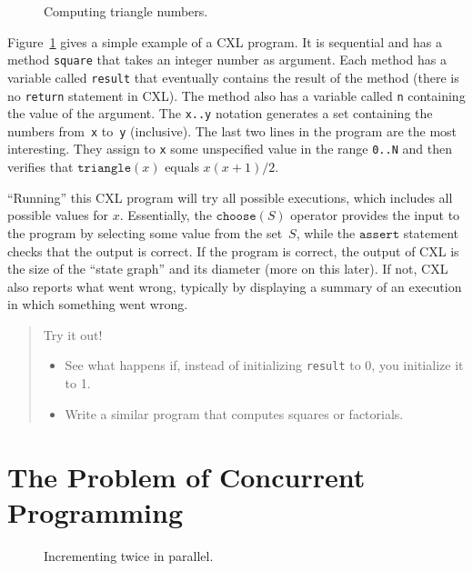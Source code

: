 \documentclass{report}
\newenvironment{code}{
\tcolorbox
}{
\endtcolorbox
}
\begin{document}
\begin{figure}
\begin{code}

\end{code}
\caption{Computing triangle numbers.}
\label{fig:triangle}
\end{figure}

Figure~\ref{fig:triangle} gives a simple example of a CXL program.
It is sequential and has a method \texttt{square} that takes
an integer number as argument.  Each method has a variable called
\texttt{result} that eventually contains the result of the
method (there is no \texttt{return} statement in CXL).  The method
also has a variable called \texttt{n} containing the value of the
argument.  The \texttt{x..y} notation generates a set containing the numbers
from~\texttt{x} to~\texttt{y} (inclusive).  The last two lines in the program are
the most interesting.
They assign to \texttt{x} some unspecified value in the range \texttt{0..N}
and then verifies that $\mathtt{triangle}(x)$ equals $x(x+1)/2$.

``Running'' this CXL program will try all possible executions, which
includes all possible values for $x$.  Essentially, the $\texttt{choose}(S)$
operator provides the input to the program by selecting some value from the
set~$S$, while the $\texttt{assert}$ statement checks that the output is
correct.  If the program is correct, the output of CXL is the size of the
``state graph'' and its diameter (more on this later).  If not, CXL also
reports what went wrong, typically by displaying a summary of an execution in
which something went wrong.

\begin{quote}
Try it out!
\begin{itemize}
\item See what happens if, instead of initializing \texttt{result} to 0,
you initialize it to 1.
\item Write a similar program that computes squares or factorials.
\end{itemize}
\end{quote}

\chapter{The Problem of Concurrent Programming}

\begin{figure}
\begin{code}

\end{code}
\caption{Incrementing twice in parallel.}
\label{fig:inc}
\end{figure}
\end{document}

